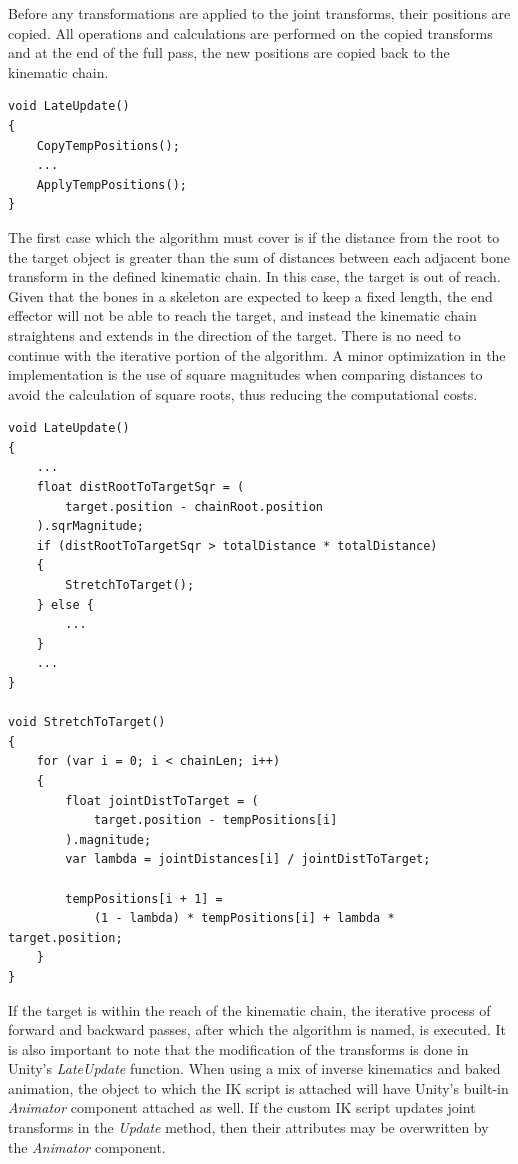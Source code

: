 Before any transformations are applied to the joint transforms, their positions
are copied. All operations and calculations are performed on the copied
transforms and at the end of the full pass, the new positions are copied back to
the kinematic chain.

\begin{lstlisting}[basicstyle=\footnotesize, numbers=none,frame=single,
caption={Joint transforms are copied at the start. Operations are performed on
these copied joints, before applying them back to the kinematic
chain},captionpos=b, label=transform_copy, language={[Sharp]c}]
void LateUpdate()
{
    CopyTempPositions();
    ...
    ApplyTempPositions();
}
\end{lstlisting}

The first case which the algorithm must cover is if the distance from the root
to the target object is greater than the sum of distances between each adjacent
bone transform in the defined kinematic chain. In this case, the target is out
of reach. Given that the bones in a skeleton are expected to keep a fixed
length, the end effector will not be able to reach the target, and instead the
kinematic chain straightens and extends in the direction of the target. There is
no need to continue with the iterative portion of the algorithm. A minor
optimization in the implementation is the use of square magnitudes when
comparing distances to avoid the calculation of square roots, thus reducing the
computational costs.

\begin{lstlisting}[basicstyle=\footnotesize, numbers=none,frame=single, caption={Target out of
reach},captionpos=b, label=stretch, language={[Sharp]c}]
void LateUpdate()
{
    ...
    float distRootToTargetSqr = (
        target.position - chainRoot.position
    ).sqrMagnitude;
    if (distRootToTargetSqr > totalDistance * totalDistance)
    {
        StretchToTarget();
    } else {
        ...
    }
    ...
}

void StretchToTarget()
{
    for (var i = 0; i < chainLen; i++)
    {
        float jointDistToTarget = (
            target.position - tempPositions[i]
        ).magnitude;
        var lambda = jointDistances[i] / jointDistToTarget;

        tempPositions[i + 1] =
            (1 - lambda) * tempPositions[i] + lambda * target.position;
    }
}
\end{lstlisting}

If the target is within the reach of the kinematic chain, the iterative process
of forward and backward passes, after which the algorithm is named, is executed.
It is also important to note that the modification of the transforms is done in
Unity's \textit{LateUpdate} function. When using a mix of inverse kinematics and
baked animation, the object to which the IK script is attached will have Unity's
built-in \textit{Animator} component attached as well. If the custom IK script
updates joint transforms in the \textit{Update} method, then their attributes
may be overwritten by the \textit{Animator} component. 


